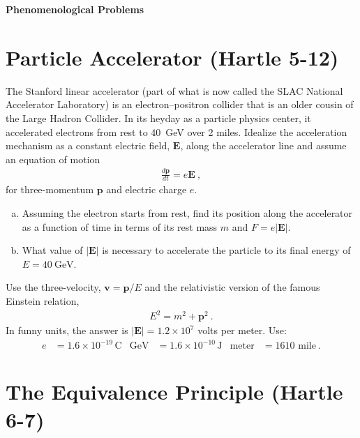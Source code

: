 \documentclass[12pt]{article}
\numberwithin{equation}{section}    %
\renewcommand{\vec}[1]{\mathbf{#1}} %
\begin{document}
\vspace{2em}
{\Large\textbf{\textsf{Phenomenological Problems}}}

\section{Particle Accelerator (Hartle 5-12)}

The Stanford linear accelerator (part of what is now called the SLAC National Accelerator Laboratory) is an electron--positron collider that is an older cousin of the Large Hadron Collider. In its heyday as a particle physics center, it accelerated electrons from rest to 40~GeV over 2 miles. Idealize the acceleration mechanism as a constant electric field, $\vec E$, along the accelerator line and assume an equation of motion
\begin{align}
	\frac{d\vec p}{dt} = e \vec E \ ,
\end{align}
for three-momentum $\vec p$ and electric charge $e$.
\begin{enumerate}[(a)]
	\item Assuming the electron starts from rest, find its position along the accelerator as a function of time in terms of its rest mass $m$ and $F = e|\vec E|$. 
	\item What value of $|\vec E|$ is necessary to accelerate the particle to its final energy of $E = 40~\text{GeV}$. 
\end{enumerate}
Use the three-velocity, $\vec v = \vec p/E$ and the relativistic version of the famous Einstein relation,
\begin{align}
	E^2 = m^2 + \vec p^2 \ .
\end{align}
In funny units, the answer is $|\vec E| = 1.2\times 10^{7}$ volts per meter. Use:
\begin{align}
	e &= 1.6 \times 10^{-19} \, \text{C}
	&
	\text{GeV} &= 1.6\times 10^{-10}\, \text{J} 
	&
	\text{meter} &= 1610\text{ mile} \ .
\end{align}

\section{The Equivalence Principle (Hartle 6-7)}
\end{document}
